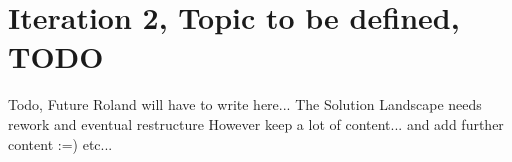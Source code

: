 
\section{Iteration 2, Topic to be defined, TODO}



Todo, Future Roland will have to write here...
The Solution Landscape needs rework and eventual restructure
However keep a lot of content... and add further content :=)
etc...
